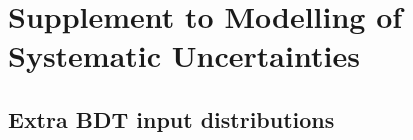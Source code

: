 \chapter{Supplement to Modelling of Systematic Uncertainties}
\label{app:syst-summary}

\section{Extra BDT input distributions}
\label{app:bdt-inputs}

